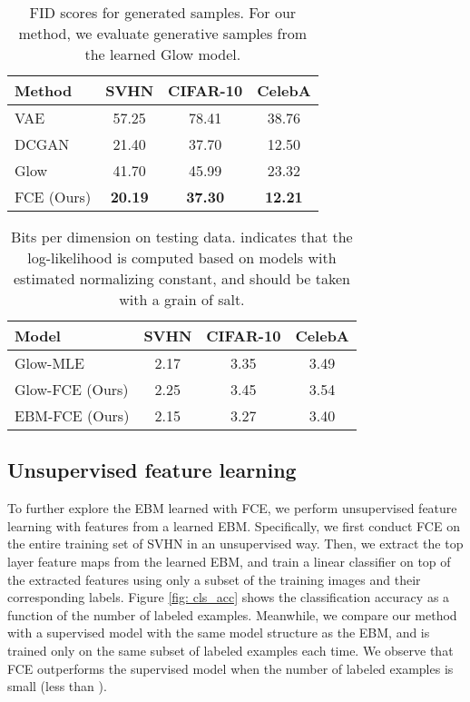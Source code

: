 \documentclass[10pt,twocolumn,letterpaper]{article}
\begin{document}
\begin{table}
\centering
 \caption{FID scores for generated samples. For our method, we evaluate generative samples from the learned Glow model.}
 \label{tab: fid}
 \footnotesize
  \begin{tabular}{lccc}
    \toprule
     Method   & SVHN & CIFAR-10 & CelebA \\
        \midrule
     VAE \cite{kingma2013auto}       &57.25 & 78.41& 38.76 \\
     DCGAN \cite{radford2015unsupervised} &   21.40 & 37.70 & 12.50 \\
     Glow \cite{kingma2018Glow} & 41.70 &  45.99 & 23.32\\
     FCE (Ours) & {\bf 20.19}  & {\bf 37.30} & {\bf 12.21} \\
        \bottomrule
    \end{tabular}
\end{table}

\begin{table}
\centering
 \caption{Bits per dimension on testing data.  indicates that the log-likelihood is computed based on models with estimated normalizing constant, and should be taken with a grain of salt.}
 \label{tab: llh} 
 \setlength{\tabcolsep}{4pt}
 \footnotesize
  \begin{tabular}{lccc}
    \toprule
        Model & SVHN & CIFAR-10 & CelebA \\
        \midrule
        Glow-MLE &2.17    &  3.35 & 3.49 \\
        Glow-FCE (Ours) & 2.25& 3.45 & 3.54\\
        EBM-FCE (Ours) & 2.15  & 3.27 & 3.40 \\
        \bottomrule
    \end{tabular}
\end{table}




\subsection{Unsupervised feature learning}

To further explore the EBM learned with FCE, we perform unsupervised feature learning with features from a learned EBM. Specifically, we first conduct FCE on the entire training set of SVHN in an unsupervised way. Then, we extract the top layer feature maps from the learned EBM, and train a linear classifier on top of the extracted features using only a subset of the training images and their corresponding labels.  Figure \ref{fig: cls_acc} shows the classification accuracy as a function of the number of labeled examples. Meanwhile, we compare our method with a supervised model with the same model structure as the EBM, and is trained only on the same subset of labeled examples each time. We observe that FCE outperforms the supervised model when the number of labeled examples is small (less than ). 
 
\end{document}
